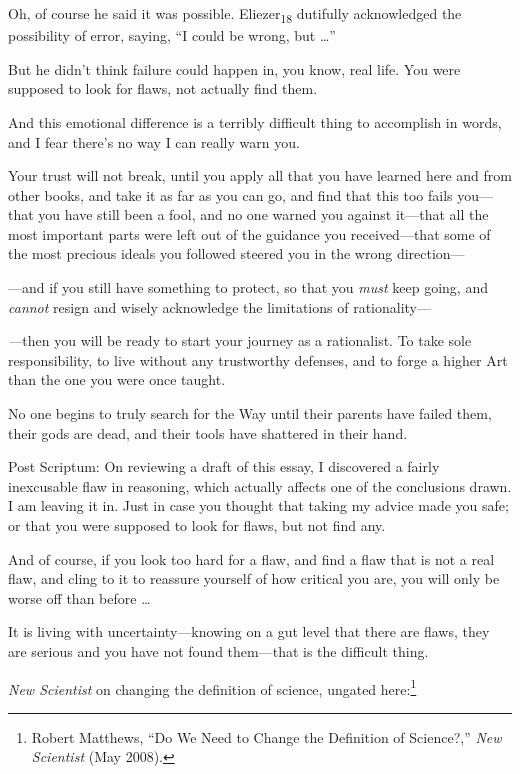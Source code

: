 {
 Oh, of course he said it was possible. Eliezer\textsubscript{18}
dutifully acknowledged the possibility of error, saying,
``I could be wrong, but \ldots''}

{
 But he didn't think failure could happen in, you
know, real life. You were supposed to look for flaws, not actually find
them.}

{
 And this emotional difference is a terribly difficult thing to
accomplish in words, and I fear there's no way I can
really warn you.}

{
 Your trust will not break, until you apply all that you have
learned here and from other books, and take it as far as you can go,
and find that this too fails you---that you have still been a fool, and
no one warned you against it---that all the most important parts were
left out of the guidance you received---that some of the most precious
ideals you followed steered you in the wrong direction---}

{
 {}---and if you still have something to protect, so that you
\textit{must} keep going, and \textit{cannot} resign and wisely
acknowledge the limitations of rationality---}

{
 \textit{{}---}then you will be ready to start your journey as a
rationalist. To take sole responsibility, to live without any
trustworthy defenses, and to forge a higher Art than the one you were
once taught.}

{
 No one begins to truly search for the Way until their parents have
failed them, their gods are dead, and their tools have shattered in
their hand.}

{
 Post Scriptum: On reviewing a draft of this essay, I discovered a
fairly inexcusable flaw in reasoning, which actually affects one of the
conclusions drawn. I am leaving it in. Just in case you thought that
taking my advice made you safe; or that you were supposed to look for
flaws, but not find any.}

{
 And of course, if you look too hard for a flaw, and find a flaw
that is not a real flaw, and cling to it to reassure yourself of how
critical you are, you will only be worse off than before \ldots}

{
 It is living with uncertainty---knowing on a gut level that there
are flaws, they are serious and you have not found them---that is the
difficult thing.}

\myendsectiontext


{
 \textit{New Scientist} on changing the definition of science,
ungated here:\footnote{Robert Matthews, ``Do We Need to Change the
Definition of Science?,'' \textit{New Scientist} (May
2008).}}

